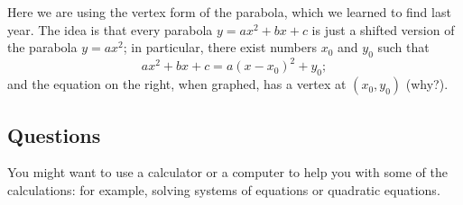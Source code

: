 Here we are using the vertex form of the parabola, which we learned to find last year. The idea is that every parabola $ y = ax^2 + bx + c $
is just a shifted version of the parabola $ y = ax^2 $; in particular, there exist numbers $ x_0 $ and $ y_0 $ such that
\begin{displaymath}
  ax^2 + bx + c = a(x - x_0)^2 + y_0;
\end{displaymath}
and the equation on the right, when graphed, has a vertex at $ (x_0, y_0) $ (why?).

\clearpage
\subsection*{Questions}
You might want to use a calculator or a computer to help you with some of the calculations: for example, solving
systems of equations or quadratic equations.
